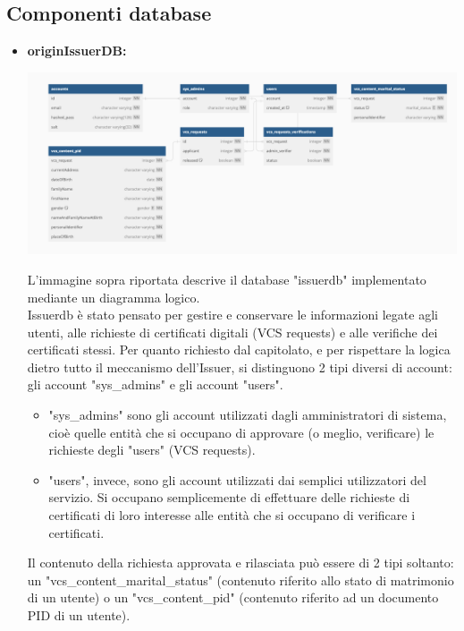\subsection{Componenti database}
\begin{itemize}
    \item \textbf{originIssuerDB:}\\
    \begin{center}
        \includegraphics[scale = 0.3]{./res/img/issuerdb.png}
      \end{center}
    L'immagine sopra riportata descrive il database "issuerdb" implementato mediante un diagramma logico.\\
    Issuerdb è stato pensato per gestire e conservare le informazioni legate agli utenti, alle richieste di certificati digitali (VCS requests) e alle verifiche dei certificati stessi.
    Per quanto richiesto dal capitolato, e per rispettare la logica dietro tutto il meccanismo dell'Issuer, si distinguono 2 tipi diversi di account: gli account "sys\_admins" e gli account "users".\\
    \begin{itemize}
    \item "sys\_admins" sono gli account utilizzati dagli amministratori di sistema, cioè quelle entità che si occupano di approvare (o meglio, verificare) le richieste degli "users" (VCS requests).\\
    \item "users", invece, sono gli account utilizzati dai semplici utilizzatori del servizio. Si occupano semplicemente di effettuare delle richieste di certificati di loro interesse alle entità che si occupano di verificare i certificati.\\
    \end{itemize}
    Il contenuto della richiesta approvata e rilasciata può essere di 2 tipi soltanto: un "vcs\_content\_marital\_status" (contenuto riferito allo stato di matrimonio di un utente) o un "vcs\_content\_pid" (contenuto riferito ad un documento PID di un utente).\\





\end{itemize}
